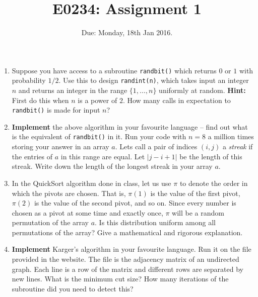 \documentclass[11pt]{article}
\begin{document}
\title{E0234: Assignment 1}
\author{}
\date{Due: Monday, 18th Jan 2016.}
\maketitle
\begin{enumerate}
	\item Suppose you have access to a subroutine {\tt randbit()} which returns $0$ or $1$ with probability $1/2$. Use this to design {\tt randint(n)}, which takes input an integer $n$ and returns an integer 
	in the range $\{1,\ldots,n\}$ uniformly at random. {\bf Hint:} First do this when $n$ is a power of $2$. How many calls in expectation to {\tt randbit()} is made for input $n$? 
	
	\item {\bf Implement} the above algorithm in your favourite language -- find out what is the equivalent of {\tt randbit()} in it. Run your code with $n=8$ a million times storing your answer in an array $a$.
	Lets call a pair of indices $(i,j)$ a {\em streak} if the entries of $a$ in this range are equal. Let $|j-i+1|$ be the length of this streak. Write down the length of the longest streak in your array $a$.
	
	\item In the QuickSort algorithm done in class, let us use $\pi$ to denote the order in which the pivots are chosen. That is, $\pi(1)$ is the value of the first pivot, $\pi(2)$ is the value of the second pivot, and so on.
	Since every number is chosen as a pivot at some time and exactly once, $\pi$ will be a random permutation of the array $a$. Is this distribution uniform among all permutations of the array? 
	Give a mathematical and rigorous explanation.
	
	\item {\bf Implement} Karger's algorithm in your favourite language. Run it on the file provided in the website. The file is the adjacency matrix of an undirected graph. Each line is a row of the matrix and different rows are separated by new lines. What is the minimum cut size? How many iterations of the subroutine did you need to detect this?
	

\end{enumerate}
\end{document}
